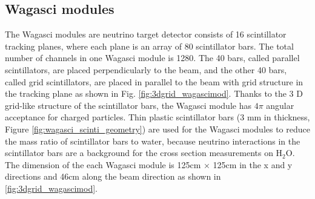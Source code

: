 \subsection{Wagasci modules}
The Wagasci modules are neutrino target detector consists of 16 scintillator tracking planes, where each plane is an array of 80 scintillator bars.
The total number of channels in one Wagasci module is 1280.
The 40 bars, called parallel scintillators, are placed perpendicularly to the beam, and the other 40 bars, called grid scintillators, are placed in parallel to the beam with grid structure in the tracking plane as shown in Fig. \ref{fig:3dgrid_wagascimod}.
Thanks to the 3 D grid-like structure of the scintillator bars, 
the Wagasci module has $4\pi$ angular acceptance for charged particles.
Thin plastic scintillator bars (3 mm in thickness, Figure \ref{fig:wagasci_scinti_geometry}) are used for the Wagasci modules
to reduce the mass ratio of scintillator bars to water,
because neutrino interactions in the scintillator bars are a background for the cross section measurements on H$_{2}$O.
The dimension of the each Wagasci module is 125cm $\times$ 125cm in the x and y directions
and 46cm along the beam direction as shown in \ref{fig:3dgrid_wagascimod}.

